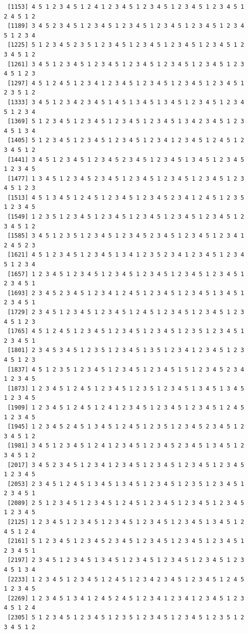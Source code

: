 \documentclass[
  english,
]{book}
\begin{document}
\begin{verbatim}
 [1153] 4 5 1 2 3 4 5 1 2 4 1 2 3 4 5 1 2 3 4 5 1 2 3 4 5 1 2 3 4 5 1 2 4 5 1 2
 [1189] 3 4 5 2 3 4 5 1 2 3 4 5 1 2 3 4 5 1 2 3 4 5 1 2 3 4 5 1 2 3 4 5 1 2 3 4
 [1225] 5 1 2 3 4 5 2 3 5 1 2 3 4 5 1 2 3 4 5 1 2 3 4 5 1 2 3 4 5 1 2 3 4 5 1 2
 [1261] 3 4 5 1 2 3 4 5 1 2 3 4 5 1 2 3 4 5 1 2 3 4 5 1 2 3 4 5 1 2 3 4 5 1 2 3
 [1297] 4 5 1 2 4 5 1 2 3 4 1 2 3 4 5 1 2 3 4 5 1 2 3 4 5 1 2 3 4 5 1 2 3 5 1 2
 [1333] 3 4 5 1 2 3 4 2 3 4 5 1 4 5 1 3 4 5 1 3 4 5 1 2 3 4 5 1 2 3 4 5 1 2 3 4
 [1369] 5 1 2 3 4 5 1 2 3 4 5 1 2 3 4 5 1 2 3 4 5 1 3 4 2 3 4 5 1 2 3 4 5 1 3 4
 [1405] 5 1 2 3 4 5 1 2 3 4 5 1 2 3 4 5 1 2 3 4 1 2 3 4 5 1 2 4 5 1 2 3 4 5 1 2
 [1441] 3 4 5 1 2 3 4 5 1 2 3 4 5 2 3 4 5 1 2 3 4 5 1 3 4 5 1 2 3 4 5 1 2 3 4 5
 [1477] 1 3 4 5 1 2 3 4 5 2 3 4 5 1 2 3 4 5 1 2 3 4 5 1 2 3 4 5 1 2 3 4 5 1 2 3
 [1513] 4 5 1 3 4 5 1 2 4 5 1 2 3 4 5 1 2 3 4 5 2 3 4 1 2 4 5 1 2 3 5 1 2 3 4 5
 [1549] 1 2 3 5 1 2 3 4 5 1 2 3 4 5 1 2 3 4 5 1 2 3 4 5 1 2 3 4 5 1 2 3 4 5 1 2
 [1585] 3 4 5 1 2 3 5 1 2 3 4 5 1 2 3 4 5 2 3 4 5 1 2 3 4 5 1 2 3 4 1 2 4 5 2 3
 [1621] 4 5 1 2 3 4 5 1 2 3 4 5 1 3 4 1 2 3 5 2 3 4 1 2 3 4 5 1 2 3 4 5 1 2 3 4
 [1657] 1 2 3 4 5 1 2 3 4 5 1 2 3 4 5 1 2 3 4 5 1 2 3 4 5 1 2 3 4 5 1 2 3 4 5 1
 [1693] 2 3 4 5 2 3 4 5 1 2 3 4 1 2 4 5 1 2 3 4 5 1 2 3 4 5 1 3 4 5 1 2 3 4 5 1
 [1729] 2 3 4 5 1 2 3 4 5 1 2 3 4 5 1 2 4 5 1 2 3 4 5 1 2 3 4 5 1 2 3 4 5 1 2 3
 [1765] 4 5 1 2 4 5 1 2 3 4 5 1 2 3 4 5 1 2 3 4 5 1 2 3 5 1 2 3 4 5 1 2 3 4 5 1
 [1801] 2 3 4 5 3 4 5 1 2 3 5 1 2 3 4 5 1 3 5 1 2 3 4 1 2 3 4 5 1 2 3 4 5 1 2 3
 [1837] 4 5 1 2 3 5 1 2 3 4 5 1 2 3 4 5 1 2 3 4 5 1 5 1 2 3 4 5 2 3 4 1 2 3 4 5
 [1873] 1 2 3 4 5 1 2 4 5 1 2 3 4 5 1 2 3 5 1 2 3 4 5 1 3 4 5 1 3 4 5 1 2 3 4 5
 [1909] 1 2 3 4 5 1 2 4 5 1 2 4 1 2 3 4 5 1 2 3 4 5 1 2 3 4 5 1 2 4 5 1 2 3 4 5
 [1945] 1 2 3 4 5 2 4 5 1 3 4 5 1 2 4 5 1 2 3 5 1 2 3 4 5 2 3 4 5 1 2 3 4 5 1 2
 [1981] 3 4 5 1 2 3 4 5 1 2 4 1 2 3 4 5 1 2 3 4 5 2 3 4 5 1 3 4 5 1 2 3 4 5 1 2
 [2017] 3 4 5 2 3 4 5 1 2 3 4 1 2 3 4 5 1 2 3 4 5 1 2 3 4 5 1 2 3 4 5 1 2 3 4 5
 [2053] 2 3 4 5 1 2 4 5 1 3 4 5 1 3 4 5 1 2 3 4 5 1 2 3 5 1 2 3 4 5 1 2 3 4 5 1
 [2089] 2 5 1 2 3 4 5 1 2 3 4 5 1 2 4 5 1 2 3 4 5 1 2 3 4 5 1 2 3 4 5 1 2 3 4 5
 [2125] 1 2 3 4 5 1 2 3 4 5 1 2 3 4 5 1 2 3 4 5 1 2 3 4 5 1 3 4 5 1 2 4 5 1 2 4
 [2161] 5 1 2 3 4 5 1 2 3 4 5 2 3 4 5 1 2 3 4 5 1 2 3 4 5 1 2 3 4 5 1 2 3 4 5 1
 [2197] 2 3 4 5 1 2 3 4 5 1 3 4 5 1 2 3 4 5 1 2 3 4 5 1 2 3 4 5 1 2 3 4 5 1 3 4
 [2233] 1 2 3 4 5 1 2 3 4 5 1 2 4 5 1 2 3 4 2 3 4 5 1 2 3 4 5 1 2 4 5 1 2 3 4 5
 [2269] 1 2 3 4 5 1 3 4 1 2 4 5 2 4 5 1 2 3 4 1 2 3 4 1 2 3 4 5 1 2 3 4 5 1 2 4
 [2305] 5 1 2 3 4 5 1 2 3 4 5 1 2 3 5 1 2 3 4 5 1 2 3 4 5 1 2 3 5 1 2 3 4 5 1 2

\end{verbatim}
\end{document}
